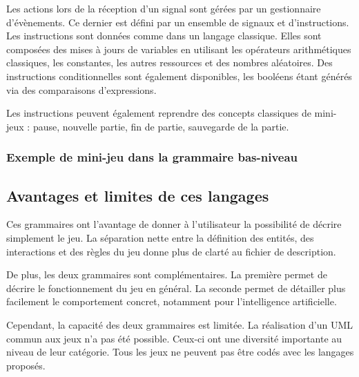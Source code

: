 Les actions lors de la réception d'un signal sont gérées par un gestionnaire d'évènements.
Ce dernier est défini par un ensemble de signaux et d'instructions.
Les instructions sont données comme dans un langage classique.
Elles sont composées des mises à jours de variables en utilisant les opérateurs arithmétiques classiques, les constantes, les autres ressources et des nombres
aléatoires.
Des instructions conditionnelles sont également disponibles, les booléens étant générés via des comparaisons d'expressions.

Les instructions peuvent également reprendre des concepts classiques de mini-jeux : pause, nouvelle partie, fin de partie, sauvegarde de la partie.


\subsubsection{Exemple de mini-jeu dans la grammaire bas-niveau}


\subsection{Avantages et limites de ces langages}

Ces grammaires ont l'avantage de donner à l'utilisateur la possibilité de décrire simplement le jeu.
La séparation nette entre la définition des entités, des interactions et des règles du jeu donne plus de clarté au fichier de description.

De plus, les deux grammaires sont complémentaires. La première permet de décrire le fonctionnement du jeu en général. La seconde permet
de détailler plus facilement le comportement concret, notamment pour l'intelligence artificielle.

\vspace{0.2cm}

Cependant, la capacité des deux grammaires est limitée.
La réalisation d'un UML commun aux jeux n'a pas été possible.
Ceux-ci ont une diversité importante au niveau de leur catégorie.
Tous les jeux ne peuvent pas être codés avec les langages proposés.
